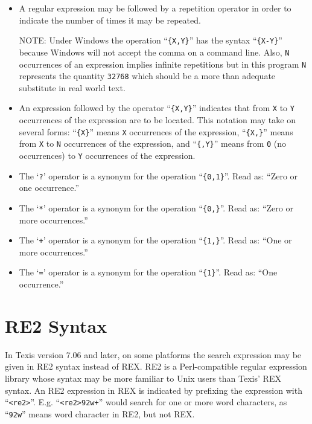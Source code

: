 \begin{itemize}
\item  A regular expression may be followed by a repetition operator in
       order to indicate the number of times it may be repeated.

     NOTE: Under Windows the operation ``\verb`{X,Y}`'' has the syntax ``\verb`{X-Y}`''
       because Windows will not accept the comma on a command line.  Also, \verb`N`
       occurrences of an expression implies infinite repetitions but in
       this program \verb`N` represents the quantity \verb`32768` which should
       be a more than adequate substitute in real world text.

\item  An expression followed by the operator ``\verb`{X,Y}`'' indicates that
       from \verb`X` to \verb`Y` occurrences of the expression are to be
       located.  This notation may take on several forms: ``\verb`{X}`''
       means \verb`X` occurrences of the expression, ``\verb`{X,}`'' means
       from \verb`X` to \verb`N` occurrences of the expression, and
       ``\verb`{,Y}`'' means from \verb`0` (no occurrences) to \verb`Y`
       occurrences of the expression.

\item  The `\verb`?`' operator is a synonym for the operation ``\verb`{0,1}`''.
       Read as: ``Zero or one occurrence.''

\item  The `\verb`*`' operator is a synonym for the operation ``\verb`{0,}`''.
       Read as: ``Zero or more occurrences.''

\item  The `\verb`+`' operator is a synonym for the operation ``\verb`{1,}`''.
       Read as: ``One or more occurrences.''

\item  The `\verb`=`' operator is a synonym for the operation ``\verb`{1}`''.
       Read as: ``One occurrence.''
\end{itemize}

\section{RE2 Syntax}

In Texis version 7.06 and later, on some platforms the search
expression may be given in RE2 syntax instead of REX.  RE2 is a
Perl-compatible regular expression library whose syntax may be more
familiar to Unix users than Texis' REX syntax.  An RE2 expression in
REX is indicated by prefixing the expression with ``{\tt {}<re2>}''.
E.g. ``{\tt {}<re2>\char92w+}'' would search for one or more word
characters, as ``{\tt \char92w}'' means word character in RE2, but not REX.


